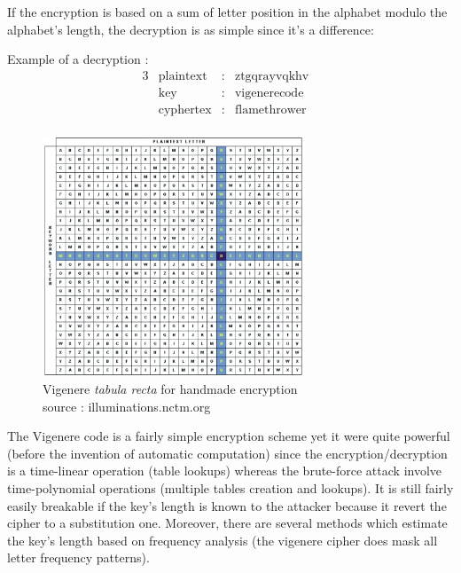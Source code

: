 If the encryption is based on a sum of letter position in the alphabet modulo the alphabet's length, the decryption is as simple since it's a difference: 

Example of a decryption : 
\begin{alignat*}{3}
    &\text{plaintext}   & : & \text{ztgqrayvqkhv}&  \\
    &\text{key}         & : & \text{vigenerecode}&  \\
    &\text{cyphertex}   & : & \text{flamethrower}&  \\ 
\end{alignat*}

\begin{figure}[ht!]
    \centering
        \includegraphics[width=0.7\textwidth]{images/vigenere}
	\caption{Vigenere \emph{tabula recta} for handmade encryption\\ source : illuminations.nctm.org}
	\label{fig:TabulaRecta}
\end{figure}

The Vigenere code is a fairly simple encryption scheme yet it were quite powerful (before the invention of automatic computation) since the encryption/decryption is a time-linear operation (table lookups) whereas the brute-force attack involve time-polynomial operations (multiple tables creation and lookups). It is still fairly easily breakable if the key's length is known to the attacker because it revert the cipher to a substitution one. Moreover, there are several methods which estimate the key's length based on frequency analysis (the vigenere cipher does mask all letter frequency patterns).\\






